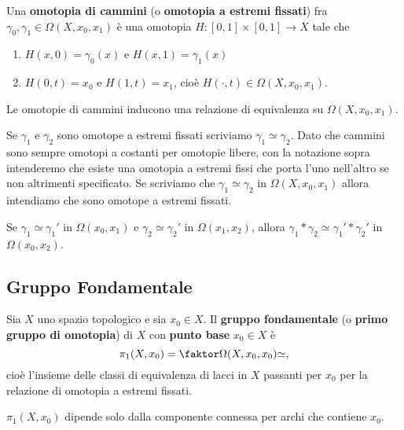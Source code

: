 \begin{multicols*}{2}
\begin{definition}
Una \textbf{omotopia di cammini} (o \textbf{omotopia a estremi fissati}) fra $\gamma_0, \gamma_1\in\Omega(X,x_0,x_1)$ è una omotopia $H:[0,1]\times[0,1]\to X$ tale che
\begin{enumerate}[noitemsep]
\item $H(x,0)=\gamma_0(x)$ e $H(x,1)=\gamma_1(x)$
\item $H(0,t)=x_0$ e $H(1,t)=x_1$, cioè $H(\cdot,t)\in\Omega(X,x_0,x_1)$.
\end{enumerate}
\end{definition}

\begin{proposition}
Le omotopie di cammini inducono una relazione di equivalenza su $\Omega(X,x_0,x_1)$.
\end{proposition}

\begin{notation}
Se $\gamma_1$ e $\gamma_2$ sono omotope a estremi fissati scriviamo $\gamma_1\simeq \gamma_2$.
Dato che cammini sono sempre omotopi a costanti per omotopie libere, con la notazione sopra intenderemo che esiste una omotopia a estremi fissi che porta l'uno nell'altro se non altrimenti specificato. Se scriviamo che $\gamma_1\simeq \gamma_2$ in $\Omega(X,x_0,x_1)$ allora intendiamo che sono omotope a estremi fissati.
\end{notation}

\begin{theorem}
Se $\gamma_1\simeq\gamma_1'$ in $\Omega(x_0,x_1)$ e $\gamma_2\simeq \gamma_2'$ in $\Omega(x_1,x_2)$, allora $\gamma_1\ast \gamma_2\simeq \gamma_1'\ast \gamma_2'$ in $\Omega(x_0,x_2)$.
\end{theorem}

\subsection{Gruppo Fondamentale}

\begin{definition}
Sia $X$ uno spazio topologico e sia $x_0\in X$. Il \textbf{gruppo fondamentale} (o \textbf{primo gruppo di omotopia}) di $X$ con \textbf{punto base} $x_0\in X$ è
\[\pi_1(X,x_0)=\quot{\Omega(X,x_0,x_0)}{\simeq},\]
cioè l'insieme delle classi di equivalenza di lacci in $X$ passanti per $x_0$ per la relazione di omotopia a estremi fissati.
\end{definition}

\begin{remark}
$\pi_1(X,x_0)$ dipende solo dalla componente connessa per archi che contiene $x_0$.
\end{remark}


\end{multicols*}
